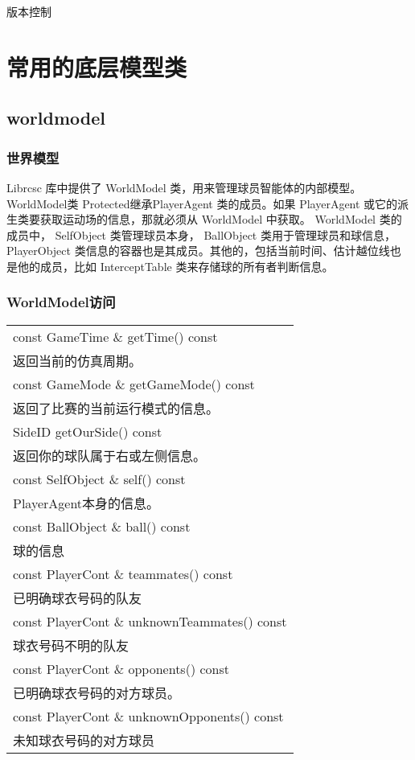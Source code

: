 版本控制


\section{常用的底层模型类}
\subsection{worldmodel}

\subsubsection{世界模型}
Librcsc 库中提供了 WorldModel 类，用来管理球员智能体的内部模型。 WorldModel类 Protected继承PlayerAgent 类的成员。如果 PlayerAgent 或它的派生类要获取运动场的信息，那就必须从 WorldModel 中获取。 WorldModel 类的成员中， SelfObject 类管理球员本身， BallObject 类用于管理球员和球信息，PlayerObject 类信息的容器也是其成员。其他的，包括当前时间、估计越位线也是他的成员，比如 InterceptTable 类来存储球的所有者判断信息。
\subsubsection{WorldModel访问}

	\begin{tabular}{p{}}
		\hline
		const GameTime \& getTime() const \\ 返回当前的仿真周期。\\
		\hline
		const GameMode \& getGameMode() const\\
		返回了比赛的当前运行模式的信息。\\
		\hline
		SideID getOurSide() const\\
		返回你的球队属于右或左侧信息。\\
		\hline
		const SelfObject \& self() const\\
		PlayerAgent本身的信息。\\
		\hline
		const BallObject \& ball() const\\
		球的信息\\
		\hline
		const PlayerCont \& teammates() const\\
		已明确球衣号码的队友\\
		\hline
		const PlayerCont \& unknownTeammates() const\\
		球衣号码不明的队友\\
		\hline
		const PlayerCont \& opponents() const\\
		已明确球衣号码的对方球员。\\
		\hline
		const PlayerCont \& unknownOpponents() const\\
		未知球衣号码的对方球员 \\
		\hline
	\end{tabular}

